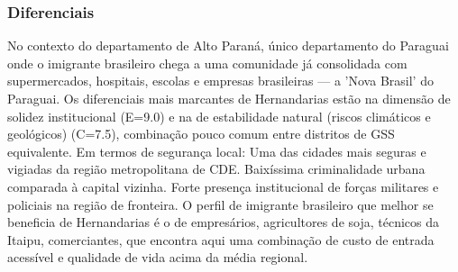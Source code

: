 \subsubsection*{Diferenciais}\label{dif-hernandarias-1005}
No contexto do departamento de Alto Paraná, único departamento do Paraguai onde o imigrante brasileiro chega a uma comunidade já consolidada com supermercados, hospitais, escolas e empresas brasileiras — a 'Nova Brasil' do Paraguai. Os diferenciais mais marcantes de Hernandarias estão na dimensão de solidez institucional (E=9.0) e na de estabilidade natural (riscos climáticos e geológicos) (C=7.5), combinação pouco comum entre distritos de GSS equivalente. Em termos de segurança local: Uma das cidades mais seguras e vigiadas da região metropolitana de CDE. Baixíssima criminalidade urbana comparada à capital vizinha. Forte presença institucional de forças militares e policiais na região de fronteira. O perfil de imigrante brasileiro que melhor se beneficia de Hernandarias é o de empresários, agricultores de soja, técnicos da Itaipu, comerciantes, que encontra aqui uma combinação de custo de entrada acessível e qualidade de vida acima da média regional.
